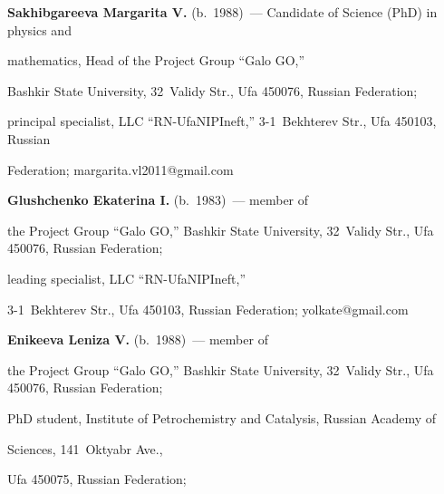   


  \Contr


  


 


  \noindent


  \textbf{Sakhibgareeva Margarita V.} (b.\ 1988)~--- Candidate of Science (PhD) in physics and 


mathematics, Head of the Project Group ``Galo GO,''


Bashkir State University, 32~Validy Str., Ufa 450076, Russian Federation;


principal specialist, LLC ``RN-UfaNIPIneft,''  3-1~Bekhterev Str., Ufa 450103, Russian 


Federation; \mbox{margarita.vl2011@gmail.com}





 \vspace*{3pt}





 \noindent


  \textbf{Glushchenko Ekaterina I.} (b.\ 1983)~--- member of


  the Project Group ``Galo GO,'' Bashkir State University, 32~Validy Str., Ufa 450076, Russian Federation;


  leading specialist, LLC ``RN-UfaNIPIneft,''  


3-1~Bekhterev Str., Ufa 450103, Russian Federation; \mbox{yolkate@gmail.com}


   


  


  


   


   \vspace*{3pt}


  


  \noindent


\textbf{Enikeeva Leniza V.} (b.\ 1988)~--- member of


  the Project Group ``Galo GO,'' Bashkir State University, 32~Validy Str., Ufa 450076, Russian Federation;


  PhD student, Institute of Petrochemistry and Catalysis, Russian Academy of


  Sciences, 141~Oktyabr Ave.,


Ufa 450075, Russian  Federation;


